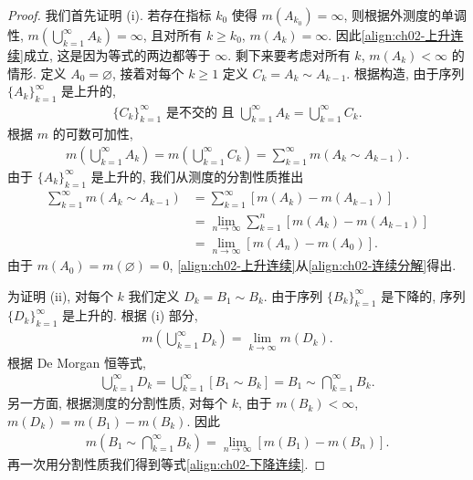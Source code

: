 \documentclass[../../main.tex]{subfiles}
\begin{document}
\begin{proof}
我们首先证明 (i). 若存在指标 $k_{0}$ 使得 $m(A_{k_{0}})=\infty$, 则根据外测度的单调性, $m(\bigcup_{k=1}^{\infty}A_{k})=\infty$, 且对所有 $k\geqslant k_{0}$, $m(A_{k})=\infty$. 因此\eqref{align:ch02-上升连续}成立, 这是因为等式的两边都等于 $\infty$. 剩下来要考虑对所有 $k$, $m(A_{k})<\infty$ 的情形. 定义 $A_{0}=\varnothing$, 接着对每个 $k\geqslant 1$ 定义 $C_{k}=A_{k}\sim A_{k-1}$. 根据构造, 由于序列 $\{A_{k}\}_{k=1}^{\infty}$ 是上升的,
\begin{align*}
\{C_{k}\}_{k=1}^{\infty}\text{ 是不交的 且 }\bigcup_{k=1}^{\infty}A_{k}=\bigcup_{k=1}^{\infty}C_{k}.
\end{align*}
根据 $m$ 的可数可加性,
\begin{align}
m\left(\bigcup_{k=1}^{\infty}A_{k}\right)=m\left(\bigcup_{k=1}^{\infty}C_{k}\right)=\sum_{k=1}^{\infty}m(A_{k}\sim A_{k-1}).\label{align:ch02-连续分解}
\end{align}
由于 $\{A_{k}\}_{k=1}^{\infty}$ 是上升的, 我们从测度的分割性质推出
\begin{align*}
\sum_{k=1}^{\infty}m(A_{k}\sim A_{k-1})&=\sum_{k=1}^{\infty}\left[m(A_{k})-m(A_{k-1})\right]\\
&=\lim_{n\to\infty}\sum_{k=1}^{n}\left[m(A_{k})-m(A_{k-1})\right]\\
&=\lim_{n\to\infty}\left[m(A_{n})-m(A_{0})\right].
\end{align*}
由于 $m(A_{0})=m(\varnothing)=0$, \eqref{align:ch02-上升连续}从\eqref{align:ch02-连续分解}得出.

为证明 (ii), 对每个 $k$ 我们定义 $D_{k}=B_{1}\sim B_{k}$. 由于序列 $\{B_{k}\}_{k=1}^{\infty}$ 是下降的, 序列 $\{D_{k}\}_{k=1}^{\infty}$ 是上升的. 根据 (i) 部分,
\begin{align*}
m\left(\bigcup_{k=1}^{\infty}D_{k}\right)=\lim_{k\to\infty}m(D_{k}).
\end{align*}
根据 De Morgan 恒等式,
\begin{align*}
\bigcup_{k=1}^{\infty}D_{k}=\bigcup_{k=1}^{\infty}\left[B_{1}\sim B_{k}\right]=B_{1}\sim\bigcap_{k=1}^{\infty}B_{k}.
\end{align*}
另一方面, 根据测度的分割性质, 对每个 $k$, 由于 $m(B_{k})<\infty$, $m(D_{k})=m(B_{1})-m(B_{k})$. 因此
\begin{align*}
m\left(B_{1}\sim\bigcap_{k=1}^{\infty}B_{k}\right)=\lim_{n\to\infty}\left[m(B_{1})-m(B_{n})\right].
\end{align*}
再一次用分割性质我们得到等式\eqref{align:ch02-下降连续}.
\end{proof}
\end{document}
